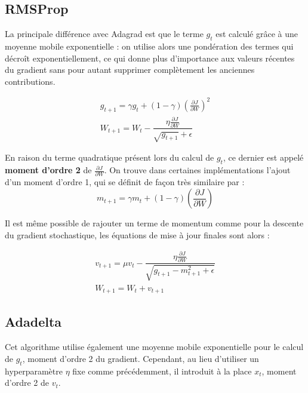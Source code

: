 \subsection{RMSProp}

La principale différence avec Adagrad est que le terme $g_t$ est calculé grâce à une moyenne mobile exponentielle : on utilise alors une pondération des termes qui décroît exponentiellement, ce qui donne plus d'importance aux valeurs récentes du gradient sans pour autant supprimer complètement les anciennes contributions. 

\begin{equation} 
\begin{aligned}
g_{t+1} = \gamma g_t + (1-\gamma)(\frac{\partial J}{\partial W})^2 \\
W_{t+1} = W_t - \dfrac{\eta\frac{\partial J}{\partial W}}{\sqrt{g_{t+1}} + \epsilon}
\end{aligned}
\end{equation} 

En raison du terme quadratique présent lors du calcul de $g_t$, ce dernier est appelé \textbf{moment d'ordre 2} de $\frac{\partial J}{\partial W}$. On trouve dans certaines implémentations l'ajout d'un moment d'ordre 1, qui se définit de façon très similaire par :
\begin{equation} 
m_{t+1} = \gamma m_t + (1-\gamma)(\frac{\partial J}{\partial W})
\end{equation} 

Il est même possible de rajouter un terme de momentum comme pour la descente du gradient stochastique, les équations de mise à jour finales sont alors :

\begin{equation} 
\begin{aligned}
v_{t+1} = \mu v_t - \dfrac{\eta \frac{\partial J}{\partial W}}{\sqrt{g_{t+1}-m^2_{t+1}+\epsilon}}\\
W_{t+1} = W_t + v_{t+1}
\end{aligned}
\end{equation} 

\subsection{Adadelta}

Cet algorithme utilise également une moyenne mobile exponentielle pour le calcul de $g_t$, moment d'ordre 2 du gradient. Cependant, au lieu d'utiliser un hyperparamètre $\eta$ fixe comme précédemment, il introduit à la place $x_t$, moment d'ordre 2 de $v_t$.

